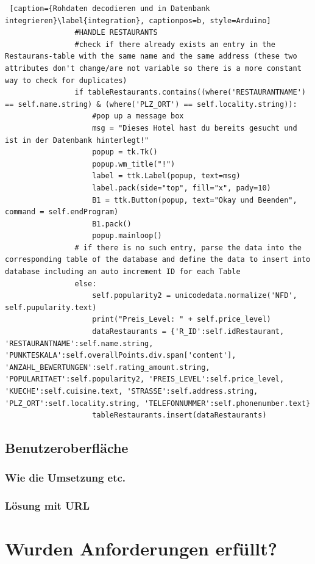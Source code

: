 \documentclass[a4paper,oneside,12pt]{report}
\begin{document}
				\begin{lstlisting} [caption={Rohdaten decodieren und in Datenbank integrieren}\label{integration}, captionpos=b, style=Arduino]
				#HANDLE RESTAURANTS
				#check if there already exists an entry in the Restaurans-table with the same name and the same address (these two attributes don't change/are not variable so there is a more constant way to check for duplicates)
				if tableRestaurants.contains((where('RESTAURANTNAME') == self.name.string) & (where('PLZ_ORT') == self.locality.string)): 
					#pop up a message box
					msg = "Dieses Hotel hast du bereits gesucht und ist in der Datenbank hinterlegt!"
					popup = tk.Tk()
					popup.wm_title("!")
					label = ttk.Label(popup, text=msg)
					label.pack(side="top", fill="x", pady=10)
					B1 = ttk.Button(popup, text="Okay und Beenden", command = self.endProgram)
					B1.pack()
					popup.mainloop()
				# if there is no such entry, parse the data into the corresponding table of the database and define the data to insert into database including an auto increment ID for each Table       
				else:
					self.popularity2 = unicodedata.normalize('NFD', self.pupularity.text)
					print("Preis_Level: " + self.price_level)
					dataRestaurants = {'R_ID':self.idRestaurant, 'RESTAURANTNAME':self.name.string, 'PUNKTESKALA':self.overallPoints.div.span['content'], 'ANZAHL_BEWERTUNGEN':self.rating_amount.string, 'POPULARITAET':self.popularity2, 'PREIS_LEVEL':self.price_level, 'KUECHE':self.cuisine.text, 'STRASSE':self.address.string, 'PLZ_ORT':self.locality.string, 'TELEFONNUMMER':self.phonenumber.text}
					tableRestaurants.insert(dataRestaurants)
				\end{lstlisting}
				
				
		\section{Benutzeroberfläche}
		
			\subsection{Wie die Umsetzung etc.}
			
			\subsection{Lösung mit URL}
	
	


	\chapter{Wurden Anforderungen erfüllt?}		
	
\end{document}
